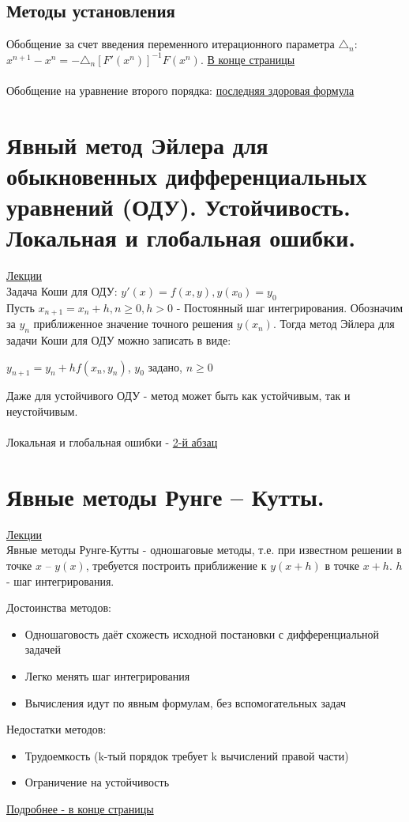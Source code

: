 \documentclass[specialist, subf, href, colorlinks=true, 12pt, times, mtpro, final]{disser}
\theoremstyle{definition}
\begin{document}
\subsection {Методы установления}

Обобщение за счет введения переменного итерационного параметра $\triangle_n$: $x^{n+1} - x^n= -\triangle_n [F'(x^n)]^{-1}F(x^n)$. \hyperlink {lects.85}{В конце страницы}
\\
\\
Обобщение на уравнение второго порядка: \hyperlink {lects.86}{последняя здоровая формула}

	

\section {Явный метод Эйлера для обыкновенных дифференциальных уравнений (ОДУ). Устойчивость. Локальная и глобальная ошибки.}
	\hyperlink {lects.87}{Лекции}\\
	Задача Коши для ОДУ: 
	$y'(x)=f(x,y), y(x_0) = y_0$\\
	
	Пусть $x_{n+1} = x_n + h, n \geq 0, h > 0$ - Постоянный шаг интегрирования. Обозначим за $y_n$ приближенное значение точного решения $y(x_n)$. Тогда метод Эйлера для задачи Коши для ОДУ можно записать в виде:\\
	\begin{center}
	$y_{n+1} = y_n + h f(x_n, y_n)$, $y_0$ задано, $n \geq 0$
	\end{center}

Даже для устойчивого ОДУ -  метод может быть как устойчивым, так и неустойчивым.\\
\\
Локальная и глобальная ошибки - \hyperlink {lects.88}{2-й абзац}


\section {Явные методы Рунге -- Кутты.}
	\hyperlink {lects.89}{Лекции}\\
	
	Явные методы Рунге-Кутты - одношаговые методы, т.е. при известном решении в точке $x$ \--- $y(x)$, требуется построить приближение к $y(x+h)$ в точке $x+h$. $h$ - шаг интегрирования.
	
	Достоинства методов:
	\begin{itemize}
	\item Одношаговость даёт схожесть исходной постановки с дифференциальной задачей
	\item Легко менять шаг интегрирования
	\item Вычисления идут по явным формулам, без вспомогательных задач
	\end{itemize}
	Недостатки методов:
	\begin{itemize}
	\item Трудоемкость (k-тый порядок требует k вычислений правой части)
	\item Ограничение на устойчивость
	\end{itemize}
	\hyperlink {lects.90}{Подробнее - в конце страницы}\\
\end{document}
